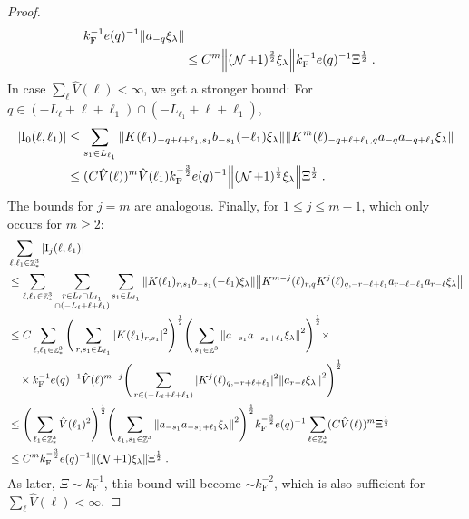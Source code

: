 \documentclass[12pt,a4paper]{article}
\numberwithin{equation}{section}
\newcommand{\1}{\mathbb{I}}
\newcommand{\F}{\mathrm{F}}
\newcommand{\I}{\mathrm{I}}
\DeclareMathOperator{\Z}{\mathbb{Z}}
\DeclareMathOperator{\NN}{\mathcal{N}}
\newcommand{\half}{\frac{1}{2}}
\theoremstyle{plain}
\theoremstyle{definition}
\theoremstyle{remark}
\theoremstyle{plain}
\theoremstyle{definition}
\theoremstyle{remark}
\begin{document}
\begin{proof}
{\begin{align}
		k_{\F}^{-1} e(q)^{-1}
		\norm{a_{-q} \xi_\lambda } \nonumber\\
	&\leq C^m \norm{(\NN+1)^{\frac 32} \xi_\lambda}
		k_{\F}^{-1} e(q)^{-1} \Xi^\half \;. \label{eq:estEQ2171_Coulomb}
\end{align}
In case $ \sum_\ell \hat{V}(\ell) < \infty $, we get a stronger bound: For $ q \in (-L_\ell + \ell + \ell_1) \cap (-L_{\ell_1} + \ell + \ell_1) $,}
\begin{align}
	|\I_0(\ell, \ell_1)|
	&\leq \sum\limits_{s_1 \in L_{\ell_1}}
		\norm{K(\ell_1)_{-q+\ell+\ell_1,s_1} b_{-s_1}(-\ell_1) \xi_\lambda}
		\norm{ K^m(\ell)_{-q+\ell+\ell_1,q}a_{-q}a_{-q+\ell_1} \xi_\lambda } \nonumber\\
	&\leq (C \hat{V}(\ell))^m
		\hat{V}(\ell_1)
		k_{\F}^{-\frac 32} e(q)^{-1}
		\norm{(\NN+1)^\half\xi_\lambda} \Xi^\half \;. \label{eq:estEQ2171}
\end{align}
The bounds for $ j = m $ are analogous. Finally, for $ 1 \le j \le m-1 $, which only occurs for $ m \ge 2 $:
\textcolor{green!30!black}{
\begin{align}
	&\sum_{\ell,\ell_1 \in \Z^3_*} |\I_j(\ell, \ell_1)| \nonumber\\
	&\leq \sum_{\ell,\ell_1 \in \Z^3_*} \sum\limits_{\substack{r\in L_{\ell} \cap L_{\ell_1} \\ \cap (-L_{\ell}+\ell+\ell_1)}} 
		\sum\limits_{s_1\in L_{\ell_1}} \norm{K(\ell_1)_{r,s_1} b_{-s_1}(-\ell_1) \xi_\lambda}\norm{ K^{m-j}(\ell)_{r,q} K^j(\ell)_{q,-r+\ell+\ell_1} a_{r-\ell-\ell_1} a_{r-\ell} \xi_\lambda } \nonumber\\
	&\leq C \sum_{\ell,\ell_1 \in \Z^3_*} \Bigg( \sum\limits_{r,s_1\in L_{\ell_1}} 
		|K(\ell_1)_{r,s_1}|^2 \Bigg)^{\half}
		\Bigg( \sum\limits_{s_1 \in \Z^3}
		\norm{a_{-s_1} a_{-s_1+\ell_1} \xi_\lambda}^2 \Bigg)^{\half} \times \nonumber\\
		&\quad \times k_{\F}^{-1} e(q)^{-1} \hat{V}(\ell)^{m-j}
		\Bigg( \sum\limits_{r\in (-L_{\ell}+\ell+\ell_1)} 
		|K^j(\ell)_{q,-r+\ell+\ell_1}|^2
		\norm{ a_{r-\ell} \xi_\lambda }^2 \Bigg)^{\half} \nonumber\\
	&\leq  \Bigg( \sum_{\ell_1 \in \Z^3_*} 
		\hat{V}(\ell_1)^2 \Bigg)^{\half}
		\Bigg( \sum\limits_{\ell_1,s_1 \in \Z^3}
		\norm{a_{-s_1} a_{-s_1+\ell_1} \xi_\lambda}^2 \Bigg)^{\half}
		k_{\F}^{-\frac 32} e(q)^{-1} \sum_{\ell \in \Z^3_*} (C \hat{V}(\ell))^m \Xi^\half \nonumber\\
	&\leq C^m k_{\F}^{-\frac 32} e(q)^{-1}
		\norm{(\NN+1) \xi_\lambda} \Xi^{\half} \;. \label{eq:estEQ2172}
\end{align}
As later, $ \Xi \sim k_{\F}^{-1} $, this bound will become $ \sim k_{\F}^{-2} $, which is also sufficient for $ \sum_\ell \hat{V}(\ell) < \infty $.}
\end{proof}
\end{document}

